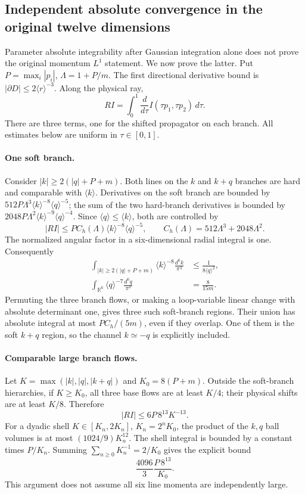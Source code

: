 \subsection{Independent absolute convergence in the original twelve dimensions}

Parameter absolute integrability after Gaussian integration alone does not
prove the original momentum $L^1$ statement. We now prove the latter.
Put $P=\max_i|p_i|$, $\Lambda=1+P/m$. The first directional derivative
bound is $|\partial D|\le2\langle r\rangle^{-3}$. Along the physical ray,
\[
 RI=\int_0^1\frac{d}{d\tau}I(\tau p_1,\tau p_2)\,d\tau.
\]
There are three terms, one for the shifted propagator on each branch.
All estimates below are uniform in $\tau\in[0,1]$.

\paragraph{One soft branch.}
Consider $|k|\ge2(|q|+P+m)$. Both lines on the $k$ and $k+q$ branches are
hard and comparable with $\langle k\rangle$. Derivatives on the soft branch
are bounded by
$512P\Lambda^3\langle k\rangle^{-8}\langle q\rangle^{-5}$;
the sum of the two hard-branch derivatives is bounded by
$2048P\Lambda^2\langle k\rangle^{-9}\langle q\rangle^{-4}$.
Since $\langle q\rangle\le\langle k\rangle$, both are controlled by
\[
 |RI|\le P C_h(\Lambda)
       \langle k\rangle^{-8}\langle q\rangle^{-5},\qquad
 C_h(\Lambda)=512\Lambda^3+2048\Lambda^2.
\]
The normalized angular factor in a six-dimensional radial integral is one.
Consequently
\begin{align*}
 \int_{|k|\ge2(|q|+P+m)}\langle k\rangle^{-8}\frac{d^6k}{\pi^3}
 &\le\frac1{8\langle q\rangle^2},\\
 \int_{\mathbb R^6}\langle q\rangle^{-7}\frac{d^6q}{\pi^3}
 &=\frac8{15m}.
\end{align*}
Permuting the three branch flows, or making a loop-variable linear change
with absolute determinant one, gives three such soft-branch regions.
Their union has absolute integral at most $PC_h/(5m)$, even if they overlap.
One of them is the soft $k+q$ region, so the channel $k\simeq-q$ is
explicitly included.

\paragraph{Comparable large branch flows.}
Let $K=\max(|k|,|q|,|k+q|)$ and $K_0=8(P+m)$. Outside the soft-branch
hierarchies, if $K\ge K_0$, all three base flows are at least $K/4$;
their physical shifts are at least $K/8$. Therefore
\[
 |RI|\le6P\,8^{13}K^{-13}.
\]
For a dyadic shell $K\in[K_n,2K_n]$, $K_n=2^nK_0$, the product of the
$k,q$ ball volumes is at most $(1024/9)K_n^{12}$. The shell integral is
bounded by a constant times $P/K_n$. Summing
$\sum_{n\ge0}K_n^{-1}=2/K_0$ gives the explicit bound
\[
 \frac{4096}{3}\frac{P\,8^{13}}{K_0}.
\]
This argument does not assume all six line momenta are independently large.

